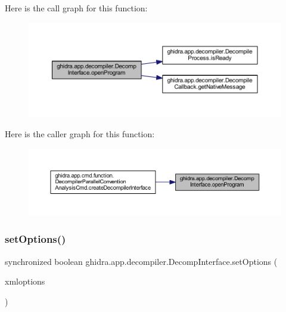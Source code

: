 Here is the call graph for this function\+:
\nopagebreak
\begin{figure}[H]
\begin{center}
\leavevmode
\includegraphics[width=350pt]{classghidra_1_1app_1_1decompiler_1_1_decomp_interface_a94b9fdc33332c1a8f1af70a2957408a6_cgraph}
\end{center}
\end{figure}
Here is the caller graph for this function\+:
\nopagebreak
\begin{figure}[H]
\begin{center}
\leavevmode
\includegraphics[width=350pt]{classghidra_1_1app_1_1decompiler_1_1_decomp_interface_a94b9fdc33332c1a8f1af70a2957408a6_icgraph}
\end{center}
\end{figure}
\mbox{\label{classghidra_1_1app_1_1decompiler_1_1_decomp_interface_a1c6be053337ad093e441a722c1b157b9}} 
\subsubsection{\texorpdfstring{setOptions()}{setOptions()}}
{\footnotesize\ttfamily synchronized boolean ghidra.\+app.\+decompiler.\+Decomp\+Interface.\+set\+Options (\begin{DoxyParamCaption}\item[{\mbox{\hyperlink{classghidra_1_1app_1_1decompiler_1_1_decompile_options}{Decompile\+Options}}}]{xmloptions }\end{DoxyParamCaption})\hspace{0.3cm}{\ttfamily [inline]}}

